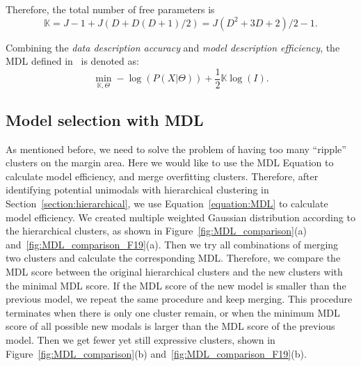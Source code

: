 Therefore, the total number of free parameters is
\begin{equation}
\mathbb{K} = J - 1 + J(D + D(D+1)/2) = J(D^2 + 3D + 2)/2 -1.
\end{equation}


Combining the \textit{data description accuracy} and \textit{model description efficiency}, 
the MDL defined in~\cite{Rissanen:1984:Universal} is denoted as:
\begin{equation}
\min_{\mathbb{K}, \Theta} - \log (P(X|\Theta)) + \frac{1}{2}\mathbb{K}\log(I).
\end{equation}\label{equation:MDL}


\subsection{Model selection with MDL}
As mentioned before, we need to solve the problem of having too many ``ripple'' clusters on the margin area.
Here we would like to use the MDL Equation to calculate model efficiency, and merge overfitting clusters.
Therefore, after identifying potential unimodals with hierarchical clustering in Section~\ref{section:hierarchical},
we use Equation~\ref{equation:MDL} to calculate model efficiency.
We created multiple weighted Gaussian distribution according to the hierarchical clusters, 
as shown in Figure~\ref{fig:MDL_comparison}(a) and~\ref{fig:MDL_comparison_F19}(a).
Then we try all combinations of merging two clusters and calculate the corresponding MDL.
Therefore, we compare the MDL score between the original hierarchical clusters and the new clusters with the minimal MDL score.
If the MDL score of the new model is smaller than the previous model, we repeat the same procedure and keep merging.
This procedure terminates when there is only one cluster remain, or when the minimum MDL score of all possible new modals is larger than the MDL score of the previous model.
Then we get fewer yet still expressive clusters, 
shown in Figure~\ref{fig:MDL_comparison}(b) and~\ref{fig:MDL_comparison_F19}(b).















